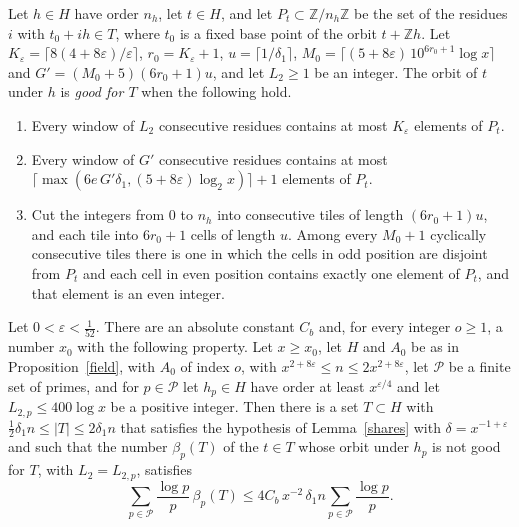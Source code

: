 \begin{definition}\label{def:goodorbit}
Let $h\in H$ have order $n_h$, let $t\in H$, and let $P_t\subset\mathbb Z/n_h\mathbb Z$ be the set of the residues $i$ with $t_0+ih\in T$, where $t_0$ is a fixed base point of the orbit $t+\mathbb Zh$. Let $K_\varepsilon=\lceil8(4+8\varepsilon)/\varepsilon\rceil$, $r_0=K_\varepsilon+1$, $u=\lceil1/\delta_1\rceil$, $M_0=\lceil(5+8\varepsilon)\,10^{6r_0+1}\log x\rceil$ and $G'=(M_0+5)(6r_0+1)u$, and let $L_2\ge1$ be an integer. The orbit of $t$ under $h$ is \emph{good for $T$} when the following hold.
\begin{enumerate}
\item[(i)] Every window of $L_2$ consecutive residues contains at most $K_\varepsilon$ elements of $P_t$.
\item[(ii)] Every window of $G'$ consecutive residues contains at most $\lceil\max(6e\,G'\delta_1,(5+8\varepsilon)\log_2x)\rceil+1$ elements of $P_t$.
\item[(iii)] Cut the integers from $0$ to $n_h$ into consecutive tiles of length $(6r_0+1)u$, and each tile into $6r_0+1$ cells of length $u$. Among every $M_0+1$ cyclically consecutive tiles there is one in which the cells in odd position are disjoint from $P_t$ and each cell in even position contains exactly one element of $P_t$, and that element is an even integer.
\end{enumerate}
\end{definition}

\begin{proposition}\label{tops}
Let $0<\varepsilon<\frac1{52}$. There are an absolute constant $C_b$ and, for every integer $o\ge1$, a number $x_0$ with the following property. Let $x\ge x_0$, let $H$ and $A_0$ be as in Proposition~\ref{field}, with $A_0$ of index $o$, with $x^{2+8\varepsilon}\le n\le2x^{2+8\varepsilon}$, let $\mathcal P$ be a finite set of primes, and for $p\in\mathcal P$ let $h_p\in H$ have order at least $x^{\varepsilon/4}$ and let $L_{2,p}\le400\log x$ be a positive integer. Then there is a set $T\subset H$ with $\frac12\delta_1n\le\lvert T\rvert\le2\delta_1n$ that satisfies the hypothesis of Lemma~\ref{shares} with $\delta=x^{-1+\varepsilon}$ and such that the number $\beta_p(T)$ of the $t\in T$ whose orbit under $h_p$ is not good for $T$, with $L_2=L_{2,p}$, satisfies
\[
\sum_{p\in\mathcal P}\frac{\log p}p\,\beta_p(T)\le4C_b\,x^{-2}\,\delta_1n\sum_{p\in\mathcal P}\frac{\log p}p .
\]
\end{proposition}

